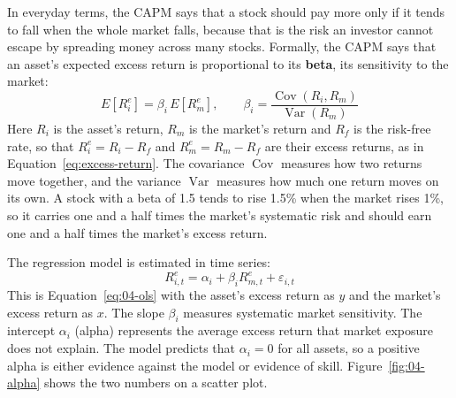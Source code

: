 In everyday terms, the CAPM says that a stock should pay more only if it tends to fall when the whole market falls, because that is the risk an investor cannot escape by spreading money across many stocks. Formally, the CAPM says that an asset's expected excess return is proportional to its \textbf{beta}, its sensitivity to the market:
\begin{equation}
  E[R^{e}_{i}] = \beta_i \, E[R^{e}_{m}], \qquad \beta_i = \frac{\operatorname{Cov}(R_i, R_m)}{\operatorname{Var}(R_m)}
  \label{eq:04-capm}
\end{equation}
Here $R_i$ is the asset's return, $R_m$ is the market's return and $R_f$ is the risk-free rate, so that $R^{e}_{i} = R_i - R_f$ and $R^{e}_{m} = R_m - R_f$ are their excess returns, as in Equation~\eqref{eq:excess-return}. The covariance $\operatorname{Cov}$ measures how two returns move together, and the variance $\operatorname{Var}$ measures how much one return moves on its own. A stock with a beta of 1.5 tends to rise 1.5\% when the market rises 1\%, so it carries one and a half times the market's systematic risk and should earn one and a half times the market's excess return.

The regression model is estimated in time series:
\begin{equation}
  R^{e}_{i,t} = \alpha_i + \beta_i R^{e}_{m,t} + \varepsilon_{i,t}
  \label{eq:04-capm-ts}
\end{equation}
This is Equation~\eqref{eq:04-ols} with the asset's excess return as $y$ and the market's excess return as $x$. The slope $\beta_i$ measures systematic market sensitivity. The intercept $\alpha_i$ (alpha) represents the average excess return that market exposure does not explain. The model predicts that $\alpha_i = 0$ for all assets, so a positive alpha is either evidence against the model or evidence of skill. Figure~\ref{fig:04-alpha} shows the two numbers on a scatter plot.

